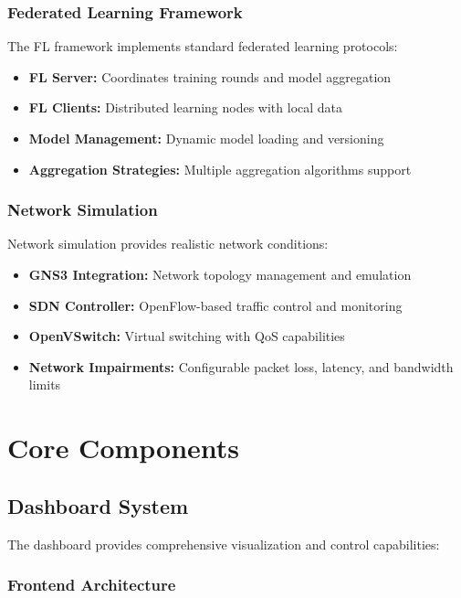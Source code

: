 \documentclass[12pt,a4paper,twoside]{article}
\begin{document}
\subsubsection{Federated Learning Framework}

The FL framework implements standard federated learning protocols:

\begin{itemize}
    \item \textbf{FL Server:} Coordinates training rounds and model aggregation
    \item \textbf{FL Clients:} Distributed learning nodes with local data
    \item \textbf{Model Management:} Dynamic model loading and versioning
    \item \textbf{Aggregation Strategies:} Multiple aggregation algorithms support
\end{itemize}

\subsubsection{Network Simulation}

Network simulation provides realistic network conditions:

\begin{itemize}
    \item \textbf{GNS3 Integration:} Network topology management and emulation
    \item \textbf{SDN Controller:} OpenFlow-based traffic control and monitoring
    \item \textbf{OpenVSwitch:} Virtual switching with QoS capabilities
    \item \textbf{Network Impairments:} Configurable packet loss, latency, and bandwidth limits
\end{itemize}

\section{Core Components}

\subsection{Dashboard System}

The dashboard provides comprehensive visualization and control capabilities:

\subsubsection{Frontend Architecture}
\end{document}
